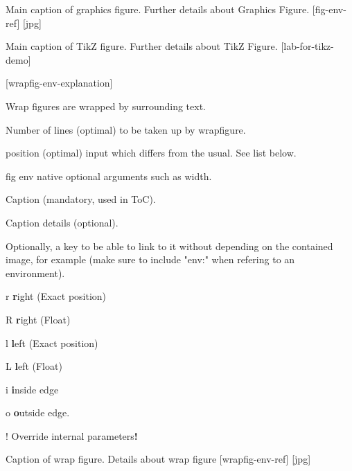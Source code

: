 \begin{myFigEnv}[][width=0.6\linewidth]
  {Main caption of graphics figure.}%
  {Further details about Graphics Figure.}%
  [fig-env-ref]
  [jpg]%
\end{myFigEnv}


\begin{myFigEnv}[][width=1\linewidth]
  {Main caption of TikZ figure.}%
  {Further details about TikZ Figure.}%
  [lab-for-tikz-demo]
\end{myFigEnv}



[wrapfig-env-explanation]

Wrap figures are wrapped by surrounding text.
\begin{myListItemize}
  \item Number of lines (optimal) to be taken up by wrapfigure.
  \item position (optimal) input which differs from the usual. See list below.
  \item fig env native optional arguments such as width.
  \item Caption (mandatory, used in ToC).
  \item Caption details (optional).
  \item Optionally, a key to be able to link to it without depending on the contained image, for example  (make sure to include "env:" when refering to an environment).
\end{myListItemize}

\begin{myListMeta}
  \item[r] \textbf{r}ight (Exact position)
  \item[R] \textbf{r}ight (Float)
  \item[l] \textbf{l}eft (Exact position)
  \item[L] \textbf{l}eft (Float)
  \item[i] \textbf{i}nside edge
  \item[o] \textbf{o}utside edge.
  \item[!] Override internal parameters\textbf{!}
\end{myListMeta}


\begin{myWrapFigEnv}[8][R][0.33\textwidth]
  {Caption of wrap figure.}%
  {Details about wrap figure}%
  [wrapfig-env-ref]
  [jpg]%
\end{myWrapFigEnv}

